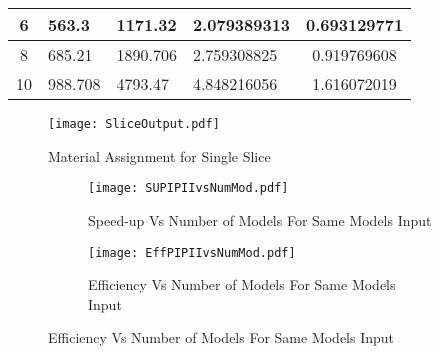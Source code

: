 \begin{table}
\begin{tabular}{|c|l|l|l|c|}
6                                                                                                                            & 563.3                                                                                                                                                                    & 1171.32                                                                                                                                    & 2.079389313                            & 0.693129771         \\ \hline
8                                                                                                                            & 685.21                                                                                                                                                                   & 1890.706                                                                                                                                   & 2.759308825                            & 0.919769608         \\ \hline
10                                                                                                                           & 988.708                                                                                                                                                                  & 4793.47                                                                                                                                    & 4.848216056                            & 1.616072019         \\ \hline
\end{tabular}
\end{table}

\begin{figure}[t]
\centering
\texttt{[image: SliceOutput.pdf]}
\caption{Material Assignment for Single Slice}
\label{fig:SliceOutput}
\end{figure}

\begin{figure}
\centering
\begin{subfigure}
\centering
\captionsetup[subfigure]{labelformat=empty}
\texttt{[image: SUPIPIIvsNumMod.pdf]}
\caption{Speed-up Vs Number of Models For Same Models Input}
\label{fig:SUPIPIIvsNumMod}
\end{subfigure}
\begin{subfigure}
\centering
\texttt{[image: EffPIPIIvsNumMod.pdf]}
\caption{Efficiency Vs Number of Models For Same Models Input}
\label{fig:EffPIPIIvsNumMod}
\end{subfigure}
\end{figure}


